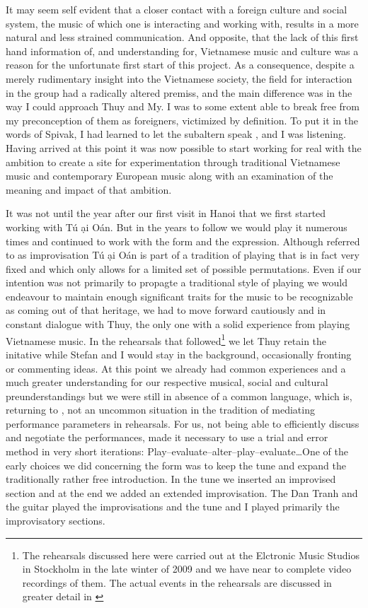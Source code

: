 \documentclass[a4paper]{article}
\begin{document}
It may seem self evident that a closer contact with a foreign culture and social system, the music of which one is interacting and working with, results in a more natural and less strained communication. And opposite, that the lack of this first hand information of, and understanding for, Vietnamese music and culture was a reason for the unfortunate first start of this project. As a consequence, despite a merely rudimentary insight into the Vietnamese society, the field for interaction in the group had a radically altered premiss, and the main difference was in the way I could approach Thuy and My. I was to some extent able to break free from my preconception of them as foreigners, victimized by definition. To put it in the words of Spivak, I had learned to let the subaltern speak \citep{spivak1988}, and I was listening. Having arrived at this point it was now possible to start working for real with the ambition to create a site for experimentation through traditional Vietnamese music and contemporary European music along with an examination of the meaning and impact of that ambition.

It was not until the year after our first visit in Hanoi that we first started working with T\'{u} \DH \d{a}i O\'{a}n. But in the years to follow we would play it numerous times and continued to work with the form and the expression. Although referred to as improvisation T\'{u} \DH \d{a}i O\'{a}n is part of a tradition of playing that is in fact very fixed and which only allows for a limited set of possible permutations. Even if our intention was not primarily to propagte a traditional style of playing we would endeavour to maintain enough significant traits for the music to be recognizable as coming out of that heritage, we had to move forward cautiously and in constant dialogue with Thuy, the only one with a solid experience from playing Vietnamese music. In the rehearsals that followed\footnote{The rehearsals discussed here were carried out at the Elctronic Music Studios in Stockholm in the late winter of 2009 and we have near to complete video recordings of them. The actual events in the rehearsals are discussed in greater detail in \citet{Ostersjo2013}} we let Thuy retain the initative while Stefan and I would stay in the background, occasionally fronting or commenting ideas. At this point we already had common experiences and a much greater understanding for our respective musical, social and cultural preunderstandings but we were still in absence of a common language, which is, returning to \citet{emmerson06}, not an uncommon situation in the tradition of mediating performance parameters in rehearsals. For us, not being able to efficiently discuss and negotiate the performances, made it necessary to use a trial and error method in very short iterations: Play--evaluate--alter--play--evaluate\ldots One of the early choices we did concerning the form was to keep the tune and expand the traditionally rather free introduction. In the tune we inserted an improvised section and at the end we added an extended improvisation. The Dan Tranh and the guitar played the improvisations and the tune and I played primarily the improvisatory sections.
\end{document}
